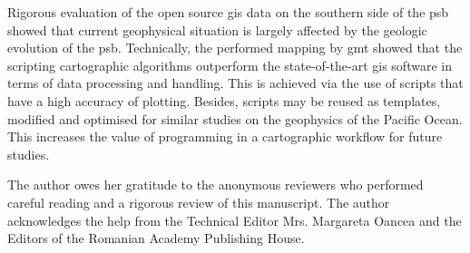 \documentclass{rrparticle}
\begin{document}
Rigorous evaluation of the open source \ac{gis} data on the southern side of the \ac{psb} showed that current geophysical situation is largely affected by the geologic evolution of the \ac{psb}. Technically, the performed mapping by \ac{gmt} showed that the scripting cartographic algorithms outperform the state-of-the-art \ac{gis} software in terms of data processing and handling. This is achieved via the use of scripts that have a high accuracy of plotting. Besides, scripts may be reused as templates, modified and optimised for similar studies on the geophysics of the Pacific Ocean. This increases the value of programming in a cartographic workflow for future studies.

\footnotesize
\singlespacing
\printacronyms[name=Acronyms and Abbreviations, heading=section]

\begin{acknowledgement}
The author owes her gratitude to the anonymous reviewers who performed careful reading and a rigorous review of this manuscript. The author acknowledges the help from the Technical Editor Mrs. Margareta Oancea and the Editors of the Romanian Academy Publishing House. 
\end{acknowledgement}
\end{document}
